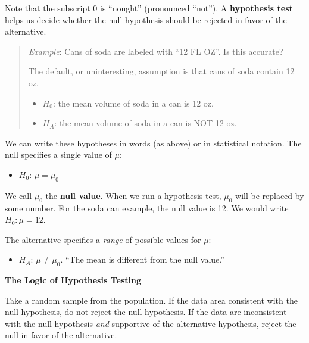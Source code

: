 \documentclass[
]{book}
\providecommand{\tightlist}{%
  \setlength{\itemsep}{0pt}\setlength{\parskip}{0pt}}
\begin{document}
Note that the subscript 0 is ``nought'' (pronounced ``not''). A \textbf{hypothesis test} helps us decide whether the null hypothesis should be rejected in favor of the alternative.

\begin{quote}
\emph{Example}: Cans of soda are labeled with ``12 FL OZ''. Is this accurate?

The default, or uninteresting, assumption is that cans of soda contain 12 oz.

\begin{itemize}
\tightlist
\item
  \(H_0\): the mean volume of soda in a can is 12 oz.
\item
  \(H_A\): the mean volume of soda in a can is NOT 12 oz.
\end{itemize}
\end{quote}

We can write these hypotheses in words (as above) or in statistical notation. The null specifies a single value of \(\mu\):

\begin{itemize}
\tightlist
\item
  \(H_0\): \(\mu=\mu_0\)
\end{itemize}

We call \(\mu_0\) the \textbf{null value}. When we run a hypothesis test, \(\mu_0\) will be replaced by some number. For the soda can example, the null value is 12. We would write \(H_0: \mu = 12\).

The alternative specifies a \emph{range} of possible values for \(\mu\):

\begin{itemize}
\tightlist
\item
  \(H_A\): \(\mu\ne\mu_0\). ``The mean is different from the null value.''
\end{itemize}

\textbf{The Logic of Hypothesis Testing}

Take a random sample from the population. If the data area consistent with the null hypothesis, do not reject the null hypothesis. If the data are inconsistent with the null hypothesis \emph{and} supportive of the alternative hypothesis, reject the null in favor of the alternative.
\end{document}
